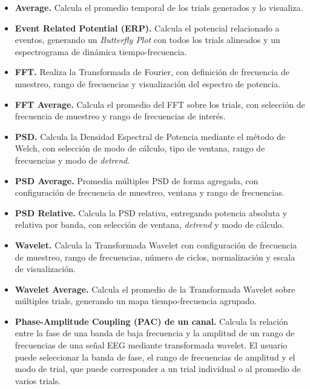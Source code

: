 \documentclass[12pt, letterpaper]{article}
\begin{document}
\begin{itemize}

    \item \textbf{Average.} Calcula el promedio temporal de los trials
    generados y lo visualiza.

    \item \textbf{Event Related Potential (ERP).} Calcula el potencial
    relacionado a eventos, generando un \textit{Butterfly Plot} con todos
    los trials alineados y un espectrograma de dinámica tiempo-frecuencia.

    \item \textbf{FFT.} Realiza la Transformada de Fourier, con definición
    de frecuencia de muestreo, rango de frecuencias y visualización del
    espectro de potencia.

    \item \textbf{FFT Average.} Calcula el promedio del FFT sobre los
    trials, con selección de frecuencia de muestreo y rango de frecuencias
    de interés.

    \item \textbf{PSD.} Calcula la Densidad Espectral de Potencia mediante
    el método de Welch, con selección de modo de cálculo, tipo de ventana,
    rango de frecuencias y modo de \textit{detrend}.

    \item \textbf{PSD Average.} Promedia múltiples PSD de forma agregada,
    con configuración de frecuencia de muestreo, ventana y rango de
    frecuencias.

    \item \textbf{PSD Relative.} Calcula la PSD relativa, entregando
    potencia absoluta y relativa por banda, con selección de ventana,
    \textit{detrend} y modo de cálculo.

    \item \textbf{Wavelet.} Calcula la Transformada Wavelet con configuración
    de frecuencia de muestreo, rango de frecuencias, número de ciclos,
    normalización y escala de visualización.

    \item \textbf{Wavelet Average.} Calcula el promedio de la Transformada
    Wavelet sobre múltiples trials, generando un mapa tiempo-frecuencia
    agrupado.

    \item \textbf{Phase-Amplitude Coupling (PAC) de un canal.} Calcula la
    relación entre la fase de una banda de baja frecuencia y la amplitud de
    un rango de frecuencias de una señal EEG mediante transformada wavelet.
    El usuario puede seleccionar la banda de fase, el rango de frecuencias
    de amplitud y el modo de trial, que puede corresponder a un trial
    individual o al promedio de varios trials.


\end{itemize}
\end{document}
